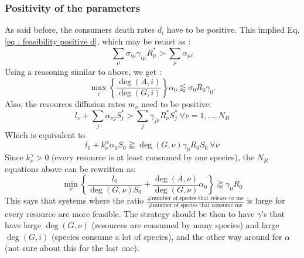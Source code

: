 \documentclass[12pt, titlepage]{report}
\begin{document}
\subsubsection{Positivity of the parameters}
As said before, the consumers death rates $d_i$ have to be positive. This implied Eq.\eqref{eq : feasibility positive d}, which may be recast as :
\begin{equation}
\sum_\mu \sigma_{i\mu}\gamma_{i\mu}R^*_\mu > \sum_\mu \alpha_{\mu i}
\end{equation}
Using a reasoning similar to above, we get :
\begin{equation} \label{eq : feasability positivity d}
\boxed{
\max_i\left\{\frac{\deg(A,i)}{\deg(G,i)}\right\} \alpha_0 \lessapprox \sigma_0R_0 \gamma_0
}.
\end{equation}
Also, the resources diffusion rates $m_\nu$ need to be positive:
\begin{equation}
l_\nu + \sum_j \alpha_{\nu j} S^*_j > \sum_j \gamma_{j\nu}R^*_\nu S^*_j \ \forall \nu=1,\dots,N_R
\end{equation}
Which is equivalent to
\begin{equation}
l_0 + k_\nu^\alpha \alpha_0 S_0 \gtrapprox \deg(G,\nu) \gamma_0 R_0 S_0 \ \forall \nu
\end{equation}
Since $k_\nu^\gamma>0$ (every resource is at least consumed by one species), the $N_R$ equations above can be rewritten as:
\begin{equation} \label{eq : feasability positivity m}
\boxed{
\min_\nu\left\{\frac{l_0}{\deg(G,\nu) S_0} + \frac{\deg(A,\nu)}{\deg(G,\nu)}\alpha_0\right\} \gtrapprox \gamma_0 R_0
}
\end{equation}
This says that systems where the ratio $\frac{\#\text{number of species that release to me}}{\#\text{number of species that consume me}}$ is large for every resource are more feasible. The strategy should be then to have $\gamma$'s that have large $\deg(G,\nu)$ (\ie resources are consumed by many species) and large $\deg(G,i)$ (\ie species consume a lot of species), and the other way around for $\alpha$ (not sure about this for the last one).
\end{document}
